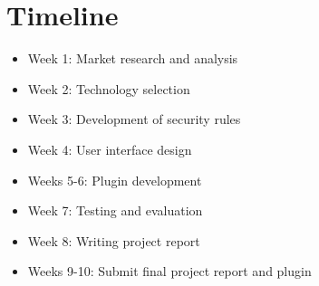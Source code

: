 \documentclass{article}
\begin{document}
\section{Timeline}

\begin{itemize}
    \item Week 1: Market research and analysis
    \item Week 2: Technology selection
    \item Week 3: Development of security rules
    \item Week 4: User interface design
    \item Weeks 5-6: Plugin development
    \item Week 7: Testing and evaluation
    \item Week 8: Writing project report
    \item Weeks 9-10: Submit final project report and plugin
\end{itemize}



\end{document}
